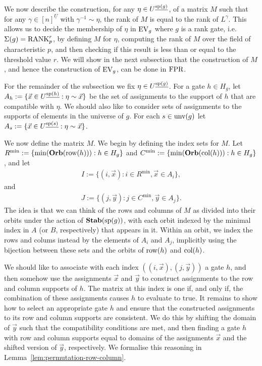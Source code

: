 \documentclass[../main/thesis.tex]{subfiles}
\begin{document}
We now describe the construction, for any $\eta \in U^{\underline{\text{sp}(g)}}$,
of a matrix $M$ such that for any $\gamma \in [n]^{\underline{U}}$ with
$\gamma^{-1} \sim \eta$, the rank of $M$ is equal to the rank of $L^{\gamma}$.
This allows us to decide the membership of $\eta$ in $\text{EV}_g$ where $g$ is a rank
gate, i.e.\ $\Sigma(g) = \text{\upshape RANK}^r_p$, by defining $M$ for $\eta$, computing the
rank of $M$ over the field of characteristic $p$, and then checking if this
result is less than or equal to the threshold value $r$. We will show in the
next subsection that the construction of $M$, and hence the construction of
$\text{EV}_g$, can be done in $\text{\upshape FPR}$.

For the remainder of the subsection we fix $\eta \in U^{\underline{\text{sp}(g)}}$.
For a gate $h \in H_g$, let $A_h := \{\vec{x} \in U^{\underline{\text{sp}(h)}} :
\eta \sim \vec{x}\}$ be the set of assignments to the support of $h$ that are
compatible with $\eta$. We should also like to consider sets of assignments to
the supports of elements in the universe of $g$. For each $s \in \text{unv}(g)$
let $A_s := \{\vec{x} \in U^{\underline{\text{sp}(s)}} : \eta \sim \vec{x}\}$.

We now define the matrix $M$. We begin by defining the index sets for $M$. Let
$R^{\min} := \{\min (\text{\textbf{Orb}}(\text{row}(h))) : h \in H_g\}$ and $C^{\min} := \{ \min
(\text{\textbf{Orb}} (\text{col}(h))) : h \in H_g\}$, and let
\begin{align*}
	I := \{(i, \vec{x}): i \in R^{\min}, \vec{x} \in A_i\}, 
\end{align*}
and
\begin{align*}
	J := \{(j, \vec{y}): j \in C^{\min}, \vec{y} \in A_j\}. 
\end{align*}
The idea is that we can think of the rows and columns of $M$ as divided into
their orbits under the action of $\text{\textbf{Stab}}(\text{sp}(g))$, with each orbit indexed by
the minimal index in $A$ (or $B$, respectively) that appears in it. Within an
orbit, we index the rows and colums instead by the elements of $A_i$ and $A_j$,
implicitly using the bijection between these sets and the orbits of $\text{row}(h)$
and $\text{col}(h)$.

We should like to associate with each index $((i, \vec{x}), (j, \vec{y}))$ a
gate $h$, and then somehow use the assignments $\vec{x}$ and $\vec{y}$ to
construct assignments to the row and column supports of $h$. The matrix at this
index is one if, and only if, the combination of these assignments causes $h$ to
evaluate to true. It remains to show how to select an appropriate gate $h$ and
ensure that the constructed assignments to its row and column supports are
consistent. We do this by shifting the domain of $\vec{y}$ such that the
compatibility conditions are met, and then finding a gate $h$ with row and
column supports equal to domains of the assignments $\vec{x}$ and the shifted
version of $\vec{y}$, respectively. We formalise this reasoning in
Lemma~\ref{lem:permutation-row-column}.
\end{document}
